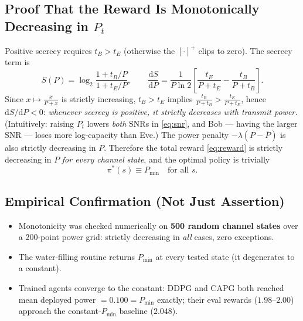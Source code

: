\documentclass[11pt]{article}
\begin{document}
\subsection{Proof That the Reward Is Monotonically Decreasing in \texorpdfstring{$P_t$}{Pt}}
Positive secrecy requires $t_B > t_E$ (otherwise the $[\cdot]^+$ clips to zero). The secrecy term is
\begin{equation}
S(P) = \log_2\frac{1 + t_B/P}{1 + t_E/P},
\qquad
\frac{\mathrm dS}{\mathrm dP}
= \frac{1}{P\ln 2}\left[\frac{t_E}{P + t_E} - \frac{t_B}{P + t_B}\right].
\end{equation}
Since $x\mapsto \frac{x}{P+x}$ is strictly increasing, $t_B > t_E$ implies
$\frac{t_B}{P+t_B} > \frac{t_E}{P+t_E}$, hence $\mathrm dS/\mathrm dP < 0$: \emph{whenever secrecy
is positive, it strictly decreases with transmit power.} (Intuitively: raising $P_t$ lowers
\emph{both} SNRs in \eqref{eq:snr}, and Bob --- having the larger SNR --- loses more log-capacity
than Eve.) The power penalty $-\lambda(P-\bar P)$ is also strictly decreasing in $P$. Therefore
the total reward \eqref{eq:reward} is strictly decreasing in $P$ \emph{for every channel state},
and the optimal policy is trivially
\begin{equation}
\boxed{\;\pi^\ast(s) \equiv P_{\min}\quad \text{for all } s.\;}
\end{equation}

\subsection{Empirical Confirmation (Not Just Assertion)}
\begin{itemize}[nosep]
\item Monotonicity was checked numerically on \textbf{500 random channel states} over a 200-point
power grid: strictly decreasing in \emph{all} cases, zero exceptions.
\item The water-filling routine returns $P_{\min}$ at every tested state (it degenerates to a
constant).
\item Trained agents converge to the constant: DDPG and CAPG both reached mean deployed power
$= 0.100 = P_{\min}$ exactly; their eval rewards ($1.98$--$2.00$) approach the constant-$P_{\min}$
baseline ($2.048$).
\end{itemize}
\end{document}
